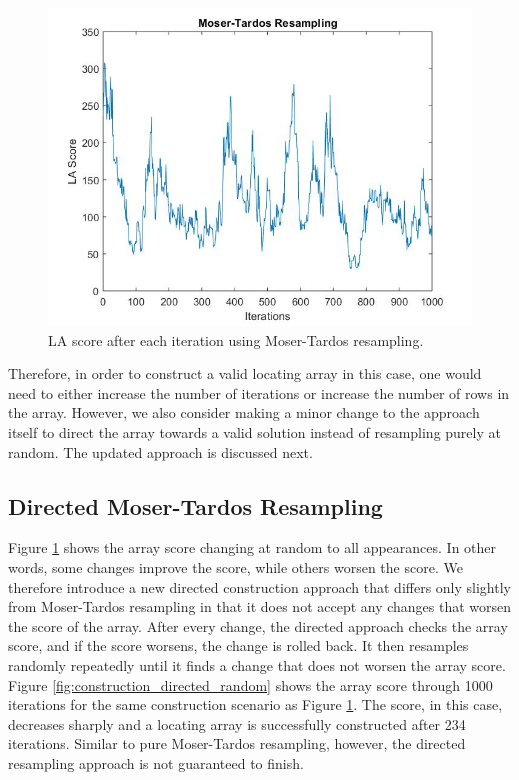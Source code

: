 \begin{figure}[htbp]
\caption{LA score after each iteration using Moser-Tardos resampling.}
\label{fig:construction_pure_mt}
\includegraphics[width=\textwidth,keepaspectratio]{images/pure_random_construction}
\end{figure}

Therefore, in order to construct a valid locating array in this case, one would need to either increase the number of iterations or increase the number of rows in the array.
However, we also consider making a minor change to the approach itself to direct the array towards a valid solution instead of resampling purely at random.
The updated approach is discussed next.

\subsection{Directed Moser-Tardos Resampling} \label{sect:directed}

Figure \ref{fig:construction_pure_mt} shows the array score changing at random to all appearances.
In other words, some changes improve the score, while others worsen the score.
We therefore introduce a new directed construction approach that differs only slightly from Moser-Tardos resampling in that it does not accept any changes that worsen the score of the array.
After every change, the directed approach checks the array score, and if the score worsens, the change is rolled back.
It then resamples randomly repeatedly until it finds a change that does not worsen the array score.
Figure \ref{fig:construction_directed_random} shows the array score through 1000 iterations for the same construction scenario as Figure \ref{fig:construction_pure_mt}.
The score, in this case, decreases sharply and a locating array is successfully constructed after 234 iterations.
Similar to pure Moser-Tardos resampling, however, the directed resampling approach is not guaranteed to finish.

